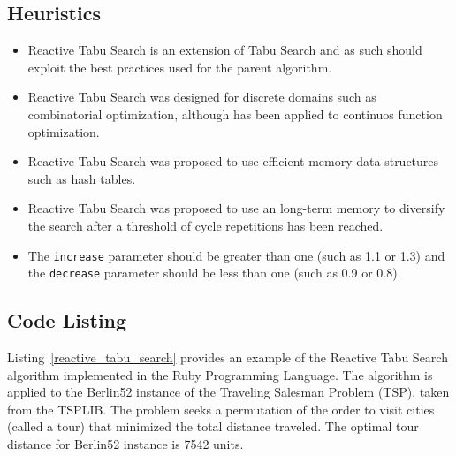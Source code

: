 \subsection{Heuristics}
\begin{itemize}
	\item Reactive Tabu Search is an extension of Tabu Search and as such should exploit the best practices used for the parent algorithm.
	\item Reactive Tabu Search was designed for discrete domains such as combinatorial optimization, although has been applied to continuos function optimization.
	\item Reactive Tabu Search was proposed to use efficient memory data structures such as hash tables.
	\item Reactive Tabu Search was proposed to use an long-term memory to diversify the search after a threshold of cycle repetitions has been reached.
	\item The \texttt{increase} parameter should be greater than one (such as 1.1 or 1.3) and the \texttt{decrease} parameter should be less than one (such as 0.9 or 0.8).
\end{itemize}

\subsection{Code Listing}
Listing~\ref{reactive_tabu_search} provides an example of the Reactive Tabu Search algorithm implemented in the Ruby Programming Language. 
The algorithm is applied to the Berlin52 instance of the Traveling Salesman Problem (TSP), taken from the TSPLIB. The problem seeks a permutation of the order to visit cities (called a tour) that minimized the total distance traveled. The optimal tour distance for Berlin52 instance is 7542 units.

